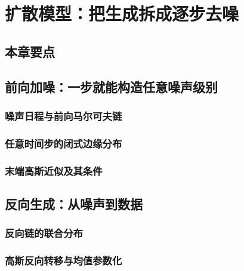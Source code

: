\chapter{扩散模型：把生成拆成逐步去噪}
\label{chap:diffusion}

\section*{本章要点}
\contentplaceholder

\section{前向加噪：一步就能构造任意噪声级别}
\label{sec:diffusion-forward}
\contentplaceholder

\subsection{噪声日程与前向马尔可夫链}
\label{subsec:diffusion-schedule}
\contentplaceholder

\subsection{任意时间步的闭式边缘分布}
\label{subsec:diffusion-marginal}
\contentplaceholder

\subsection{末端高斯近似及其条件}
\label{subsec:diffusion-terminal}
\contentplaceholder

\section{反向生成：从噪声到数据}
\label{sec:diffusion-reverse}
\contentplaceholder

\subsection{反向链的联合分布}
\label{subsec:diffusion-joint}
\contentplaceholder

\subsection{高斯反向转移与均值参数化}
\label{subsec:diffusion-gaussian}
\contentplaceholder

